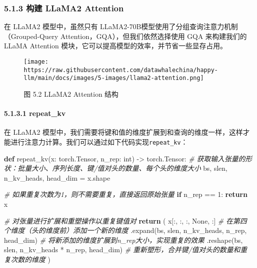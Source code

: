\documentclass[
]{article}
\newenvironment{Shaded}{}{}
\newcommand{\BuiltInTok}[1]{\textcolor[rgb]{0.00,0.50,0.00}{#1}}
\newcommand{\CommentTok}[1]{\textcolor[rgb]{0.38,0.63,0.69}{\textit{#1}}}
\newcommand{\ControlFlowTok}[1]{\textcolor[rgb]{0.00,0.44,0.13}{\textbf{#1}}}
\newcommand{\DecValTok}[1]{\textcolor[rgb]{0.25,0.63,0.44}{#1}}
\newcommand{\KeywordTok}[1]{\textcolor[rgb]{0.00,0.44,0.13}{\textbf{#1}}}
\newcommand{\NormalTok}[1]{#1}
\newcommand{\OperatorTok}[1]{\textcolor[rgb]{0.40,0.40,0.40}{#1}}
\newcommand{\VariableTok}[1]{\textcolor[rgb]{0.10,0.09,0.49}{#1}}
\begin{document}
\subsubsection{5.1.3 构建 LLaMA2
Attention}\label{ux6784ux5efa-llama2-attention}

在 LLaMA2 模型中，虽然只有
LLaMA2-70B模型使用了分组查询注意力机制（Grouped-Query
Attention，GQA），但我们依然选择使用 GQA 来构建我们的 LLaMA Attention
模块，它可以提高模型的效率，并节省一些显存占用。

\begin{figure}[htbp]\centering
\texttt{[image: https://raw.githubusercontent.com/datawhalechina/happy-llm/main/docs/images/5-images/llama2-attention.png]}
\caption{图 5.2 LLaMA2 Attention 结构}
\end{figure}

\paragraph{5.1.3.1 repeat\_kv}\label{repeat_kv}

在 LLaMA2
模型中，我们需要将键和值的维度扩展到和查询的维度一样，这样才能进行注意力计算。我们可以通过如下代码实现\texttt{repeat\_kv}：

\begin{Shaded}
\begin{Highlighting}[]
\KeywordTok{def}\NormalTok{ repeat\_kv(x: torch.Tensor, n\_rep: }\BuiltInTok{int}\NormalTok{) }\OperatorTok{{-}\textgreater{}}\NormalTok{ torch.Tensor:}
    \CommentTok{\# 获取输入张量的形状：批量大小、序列长度、键/值对头的数量、每个头的维度大小}
\NormalTok{    bs, slen, n\_kv\_heads, head\_dim }\OperatorTok{=}\NormalTok{ x.shape}
    
    \CommentTok{\# 如果重复次数为1，则不需要重复，直接返回原始张量}
    \ControlFlowTok{if}\NormalTok{ n\_rep }\OperatorTok{==} \DecValTok{1}\NormalTok{:}
        \ControlFlowTok{return}\NormalTok{ x}
    
    \CommentTok{\# 对张量进行扩展和重塑操作以重复键值对}
    \ControlFlowTok{return}\NormalTok{ (}
\NormalTok{        x[:, :, :, }\VariableTok{None}\NormalTok{, :]  }\CommentTok{\# 在第四个维度（头的维度前）添加一个新的维度}
\NormalTok{        .expand(bs, slen, n\_kv\_heads, n\_rep, head\_dim)  }\CommentTok{\# 将新添加的维度扩展到n\_rep大小，实现重复的效果}
\NormalTok{        .reshape(bs, slen, n\_kv\_heads }\OperatorTok{*}\NormalTok{ n\_rep, head\_dim)  }\CommentTok{\# 重新塑形，合并键/值对头的数量和重复次数的维度}
\NormalTok{    )}
\end{Highlighting}
\end{Shaded}
\end{document}
